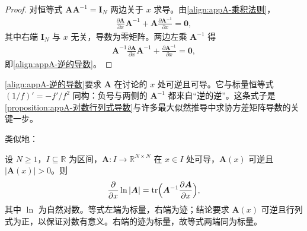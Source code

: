 \documentclass[../main.tex]{subfiles}
\begin{document}
\begin{proof}
对恒等式 $\bm{A}\bm{A}^{-1}=\bm{I}_{N}$ 两边关于 $x$ 求导。由\eqref{align:appA-乘积法则}，
\begin{align*}
 \frac{\partial\bm{A}}{\partial x}\bm{A}^{-1}+\bm{A}\frac{\partial\bm{A}^{-1}}{\partial x}=\bm{0},
\end{align*}
其中右端 $\bm{I}_{N}$ 与 $x$ 无关，导数为零矩阵。两边左乘 $\bm{A}^{-1}$ 得
\begin{align*}
 \bm{A}^{-1}\frac{\partial\bm{A}}{\partial x}\bm{A}^{-1}+\frac{\partial\bm{A}^{-1}}{\partial x}=\bm{0},
\end{align*}
即\eqref{align:appA-逆的导数}。
\end{proof}

\begin{remark}
\eqref{align:appA-逆的导数}要求 $\bm{A}$ 在讨论的 $x$ 处可逆且可导。它与标量恒等式 $(1/f)'=-f'/f^{2}$ 同构：负号与两侧的 $\bm{A}^{-1}$ 都来自“逆的逆”。这条式子是\cref{proposition:appA-对数行列式导数}与许多最大似然推导中求协方差矩阵导数的关键一步。
\end{remark}

类似地：
\begin{proposition}[对数行列式关于标量的导数]\label{proposition:appA-对数行列式导数}
设 $N\geqslant1$，$I\subseteq\mathbb{R}$ 为区间，$\bm{A}:I\to\mathbb{R}^{N\times N}$ 在 $x\in I$ 处可导，$\bm{A}(x)$ 可逆且 $|\bm{A}(x)|>0$。则
\begin{align}
  \frac{\partial}{\partial x}\ln|\bm{A}|=\mathrm{tr}\Bigl(\bm{A}^{-1}\frac{\partial\bm{A}}{\partial x}\Bigr),
  \label{align:appA-对数行列式}
\end{align}
其中 $\ln$ 为自然对数。等式左端为标量，右端为迹；结论要求 $\bm{A}(x)$ 可逆且行列式为正，以保证对数有意义。右端的迹为标量，故等式两端同为标量。
\end{proposition}
\end{document}
